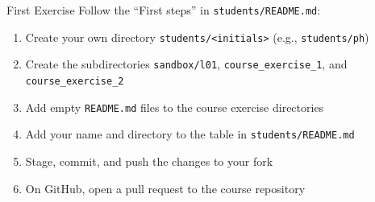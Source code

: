 \begin{frame}{First Exercise}
	Follow the ``First steps'' in \texttt{students/README.md}:
	\begin{enumerate}
		\item Create your own directory \texttt{students/<initials>} (e.g., \texttt{students/ph})
		\item Create the subdirectories \texttt{sandbox/l01}, \texttt{course\_exercise\_1}, and \texttt{course\_exercise\_2}
		\item Add empty \texttt{README.md} files to the course exercise directories
		\item Add your name and directory to the table in \texttt{students/README.md}
		\item Stage, commit, and push the changes to your fork
		\item On GitHub, open a pull request to the course repository
	\end{enumerate}
\end{frame}



